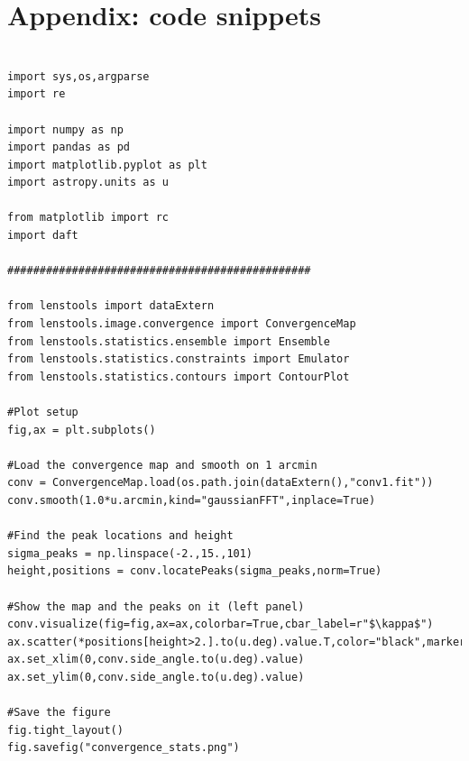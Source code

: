 \documentclass[reprint,aps,prd,superscriptaddress,showkeys,showpacs]{revtex4-1}
\begin{document}
\section*{Appendix: code snippets}

\begin{widetext}
\begin{verbatim}

import sys,os,argparse
import re

import numpy as np
import pandas as pd
import matplotlib.pyplot as plt
import astropy.units as u

from matplotlib import rc
import daft

###############################################

from lenstools import dataExtern
from lenstools.image.convergence import ConvergenceMap
from lenstools.statistics.ensemble import Ensemble
from lenstools.statistics.constraints import Emulator
from lenstools.statistics.contours import ContourPlot

#Plot setup
fig,ax = plt.subplots()
 
#Load the convergence map and smooth on 1 arcmin
conv = ConvergenceMap.load(os.path.join(dataExtern(),"conv1.fit"))
conv.smooth(1.0*u.arcmin,kind="gaussianFFT",inplace=True)

#Find the peak locations and height
sigma_peaks = np.linspace(-2.,15.,101)
height,positions = conv.locatePeaks(sigma_peaks,norm=True)

#Show the map and the peaks on it (left panel)
conv.visualize(fig=fig,ax=ax,colorbar=True,cbar_label=r"$\kappa$")
ax.scatter(*positions[height>2.].to(u.deg).value.T,color="black",marker="x")
ax.set_xlim(0,conv.side_angle.to(u.deg).value)
ax.set_ylim(0,conv.side_angle.to(u.deg).value)

#Save the figure
fig.tight_layout()
fig.savefig("convergence_stats.png")

\end{verbatim}
\end{widetext}


\label{lastpage}
\end{document}
